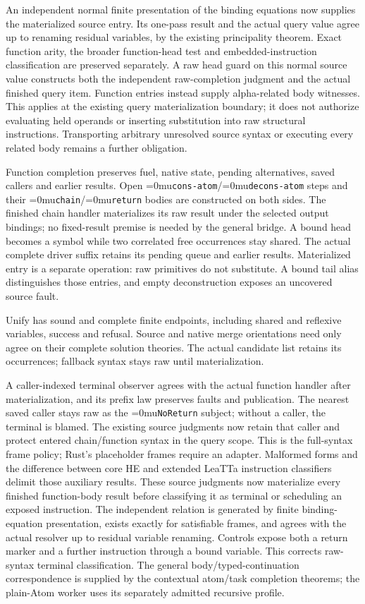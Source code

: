 \documentclass[11pt,a4paper]{article}
\newcommand{\name}[1]{\textup{\Urlmuskip=0mu\relax\nolinkurl{#1}}}
\begin{document}
An independent normal finite presentation of the binding equations now supplies
the materialized source entry. Its one-pass result and the actual query value
agree up to renaming residual variables, by the existing principality theorem.
Exact function arity, the broader function-head test and embedded-instruction
classification are preserved separately. A raw head guard on this normal
source value constructs both the independent raw-completion judgment and the
actual finished query item. Function entries instead supply alpha-related
body witnesses. This applies at the existing query materialization boundary;
it does not authorize evaluating held operands or inserting substitution into
raw structural instructions. Transporting arbitrary unresolved source syntax
or executing every related body remains a further obligation.

Function completion preserves fuel, native state, pending alternatives,
saved callers and earlier results. Open \name{cons-atom}/\name{decons-atom}
steps and their \name{chain}/\name{return} bodies are constructed on both
sides. The finished chain handler materializes its raw result under the selected
output bindings; no fixed-result premise is needed by the general bridge.
A bound head becomes a symbol while two correlated free occurrences stay shared.
The actual complete driver suffix retains its pending queue and earlier results.
Materialized entry is a separate operation: raw primitives do not substitute.
A bound tail alias distinguishes those entries, and empty deconstruction
exposes an uncovered source fault.

Unify has sound and complete finite endpoints, including shared and reflexive
variables, success and refusal. Source and native merge orientations need
only agree on their complete solution theories. The actual candidate list
retains its occurrences; fallback syntax stays raw until materialization.

A caller-indexed terminal observer agrees with the actual function handler
after materialization, and its prefix law preserves faults and publication.
The nearest saved caller stays raw as the \name{NoReturn} subject; without a
caller, the terminal is blamed. The existing source judgments now retain that
caller and protect entered chain/function syntax in the query scope. This is
the full-syntax frame policy; Rust's placeholder frames require an adapter.
Malformed forms and the difference between core HE and extended
LeaTTa instruction classifiers delimit those auxiliary results. These
source judgments now materialize every finished function-body result before
classifying it as terminal or scheduling an exposed instruction. The independent
relation is generated by finite binding-equation presentation, exists exactly
for satisfiable frames, and agrees with the actual resolver up to residual
variable renaming. Controls expose both a return marker and a further
instruction through a bound variable. This corrects raw-syntax terminal
classification. The general body/typed-continuation correspondence is supplied
by the contextual atom/task completion theorems; the plain-Atom worker uses its
separately admitted recursive profile.
\end{document}
